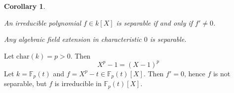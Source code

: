 \documentclass[11pt]{book}
\newtheorem{corollary}[theorem]{Corollary}
\theoremstyle{nonumberbreak}
\newenvironment{ex}[1][]{\ifthenelse{\equal{#1}{}}{\example}{\example[#1]}\rm}{\endexample}
\begin{document}
\begin{spacing}{1.3}
\begin{corollary} %
\begin{compactenum}
\item An irreducible polynomial $f \in k[X]$ is separable if and only if $f' \neq 0$. 
\item Any algebraic field extension in characteristic $0$ is separable.
\end{compactenum}
\end{corollary}

\begin{ex}
Let $\textrm{char}(k)=p>0$. Then $$X^p-1=(X-1)^p$$Let $k=\mathbb{F}_p(t)$ and $f=X^p-t \in \mathbb{F}_p(t)[X]$.
Then $f'=0$, hence $f$ is not separable, but $f$ is irreducible in $\mathbb{F}_p(t)[X]$.
\end{ex}


\end{spacing}
\end{document}
